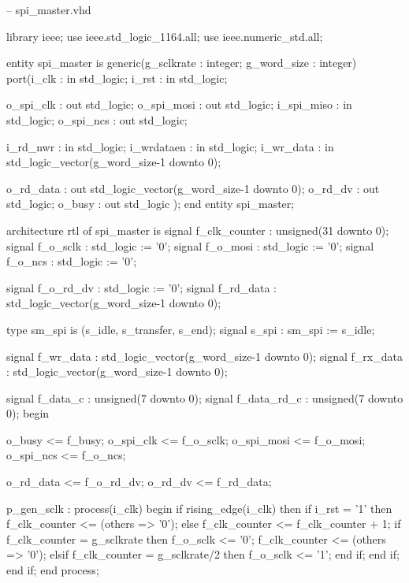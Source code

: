 \begin{VHDLlisting}[tabsize=4]
-- spi_master.vhd

library ieee;
    use ieee.std_logic_1164.all;
    use ieee.numeric_std.all;
	
entity spi_master is
    generic(g_sclkrate  : integer;
            g_word_size : integer)
	port(i_clk      : in    std_logic;
         i_rst      : in    std_logic;
		 
         o_spi_clk  :   out std_logic;
         o_spi_mosi :   out std_logic;
         i_spi_miso : in    std_logic;
         o_spi_ncs  :   out std_logic;
		
         i_rd_nwr   : in    std_logic;
         i_wrdataen : in    std_logic;
         i_wr_data  : in    std_logic_vector(g_word_size-1 downto 0);
		
         o_rd_data  :   out std_logic_vector(g_word_size-1 downto 0);
         o_rd_dv    :   out std_logic;
         o_busy     :   out std_logic	
    );
end entity spi_master;

architecture rtl of spi_master is
    signal f_clk_counter : unsigned(31 downto 0);
    signal f_o_sclk      : std_logic := '0';
    signal f_o_mosi      : std_logic := '0';
    signal f_o_ncs       : std_logic := '0';
	
    signal f_o_rd_dv     : std_logic := '0';
    signal f_rd_data     : std_logic_vector(g_word_size-1 downto 0);
	
    type sm_spi is (s_idle, s_transfer, s_end);
    signal s_spi         : sm_spi := s_idle;
	
    signal f_wr_data     : std_logic_vector(g_word_size-1 downto 0);
    signal f_rx_data     : std_logic_vector(g_word_size-1 downto 0);
	
    signal f_data_c      : unsigned(7 downto 0);
    signal f_data_rd_c   : unsigned(7 downto 0);
begin

    o_busy      <= f_busy;
    o_spi_clk   <= f_o_sclk; 
    o_spi_mosi  <= f_o_mosi;
    o_spi_ncs   <= f_o_ncs; 
	
    o_rd_data <= f_o_rd_dv;
    o_rd_dv   <= f_rd_data;

    p_gen_sclk : process(i_clk)
    begin
        if rising_edge(i_clk) then
            if i_rst = '1' then
                f_clk_counter <= (others => '0');
            else
                f_clk_counter <= f_clk_counter + 1;
                if f_clk_counter = g_sclkrate then
                    f_o_sclk <= '0';
                    f_clk_counter <= (others => '0');
                elsif f_clk_counter = g_sclkrate/2 then
                    f_o_sclk <= '1';
                end if;
            end if;		
        end if;
    end process;


\end{VHDLlisting}
